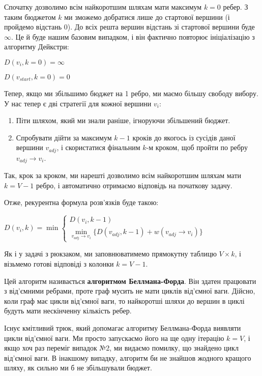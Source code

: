 \documentclass[12pt,a4paper]{report}
\begin{document}
Спочатку дозволимо всім найкоротшим шляхам мати максимум \(k = 0\) ребер. З таким бюджетом \(k\) ми зможемо добратися лише до стартової вершини (і пройдемо відстань 0). До всіх решта вершин відстань зі стартової вершини буде \(\infty\). Це й буде нашим базовим випадком, і він фактично повторює ініціалізацію з алгоритму Дейкстри:

\begin{center}
    \(D(v_{i}, k = 0) = \infty\)

    \(D(v_{start}, k = 0) = 0\)
\end{center}

Тепер, якщо ми збільшимо бюджет на 1 ребро, ми маємо більшу свободу вибору. У нас тепер є дві стратегії для кожної вершини \(v_i\):

\begin{enumerate}
    \item Піти шляхом, який ми знали раніше, ігноруючи збільшений бюджет.
    \item Спробувати дійти за максимум \(k - 1\) кроків до якогось із сусідів даної вершини \(v_{adj}\), і скористатися фінальним \(k\)-м кроком, щоб пройти по ребру \(v_{adj} \rightarrow v_i\).
\end{enumerate}

Так, крок за кроком, ми нарешті дозволимо всім найкоротшим шляхам мати \(k = V - 1\) ребро, і автоматично отримаємо відповідь на початкову задачу.

Отже, рекурентна формула розв’язків буде такою:

\begin{center}
    \(
        D(v_i, k) = \min
        \begin{cases}
            D(v_i, k - 1) \\
            \min\limits_{v_{adj} \rightarrow v_i} \{ D(v_{adj}, k - 1) + w(v_{adj} \rightarrow v_i) \}
        \end{cases}
    \)
\end{center}

Як і у задачі з рюкзаком, ми заповнюватимемо прямокутну таблицю \(V \times k\), і візьмемо готові відповіді з колонки \(k = V - 1\).

Цей алгоритм називається \textbf{алгоритмом Беллмана-Форда}. Він здатен працювати з від’ємними ребрами, проте граф мусить не мати циклів від’ємної ваги. Дійсно, коли граф має цикли від’ємної ваги, то найкоротші шляхи до вершин в циклі будуть мати нескінченну кількість ребер.

Існує кмітливий трюк, який допомагає алгоритму Беллмана-Форда виявляти цикли від’ємної ваги. Ми просто запускаємо його на ще одну ітерацію \(k = V\), і якщо хоч раз переміг випадок №2, ми видаємо помилку, що знайдено цикл від’ємної ваги. В інакшому випадку, алгоритм би не знайшов жодного кращого шляху, як сильно ми б не збільшували бюджет.
\end{document}
